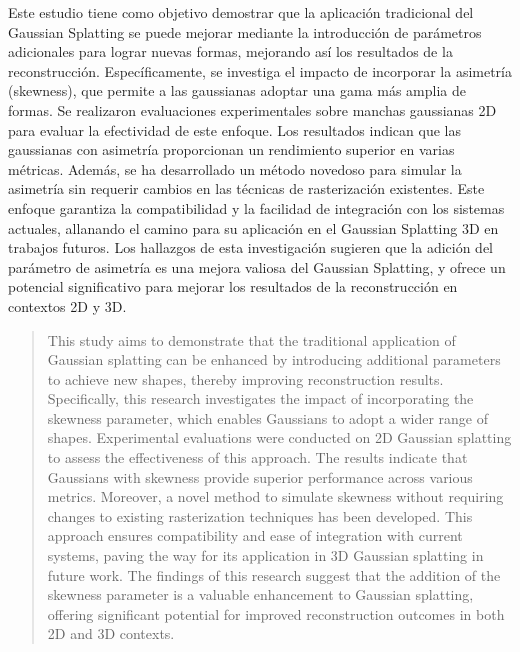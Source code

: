 \begin{resumen}
	Este estudio tiene como objetivo demostrar que la aplicación tradicional del Gaussian Splatting se puede mejorar mediante la introducción de parámetros adicionales para lograr nuevas formas, mejorando así los resultados
	de la reconstrucción. Específicamente, se investiga el impacto de incorporar la
	asimetría (skewness), que permite a las gaussianas adoptar una gama más amplia de formas. Se realizaron
	evaluaciones experimentales sobre manchas gaussianas 2D para evaluar la efectividad de este enfoque. Los
	resultados indican que las gaussianas con asimetría proporcionan un rendimiento superior en varias métricas. 
	Además, se ha desarrollado un método novedoso para simular la asimetría sin requerir cambios en las técnicas de rasterización existentes. Este enfoque garantiza la compatibilidad
	y la facilidad de integración con los sistemas actuales, allanando el camino para su aplicación en el Gaussian
	Splatting 3D en trabajos futuros. Los hallazgos de esta investigación sugieren que la adición del parámetro de
	asimetría es una mejora valiosa del Gaussian Splatting, y ofrece un potencial significativo para mejorar los
	resultados de la reconstrucción en contextos 2D y 3D.
\end{resumen}

\begin{abstract}
	This study aims to demonstrate that the traditional application of Gaussian splatting can be enhanced by
	introducing additional parameters to achieve new shapes, thereby improving reconstruction results. Specifically,
	this research investigates the impact of incorporating the skewness parameter, which enables Gaussians to adopt
	a wider range of shapes. Experimental evaluations were conducted on 2D Gaussian splatting to assess the
	effectiveness of this approach. The results indicate that Gaussians with skewness provide superior performance
	across various metrics. Moreover, a novel method to simulate skewness
	without requiring changes to existing rasterization techniques has been developed. This approach ensures
	compatibility and ease of integration with current systems, paving the way for its application in 3D Gaussian
	splatting in future work. The findings of this research suggest that the addition of the skewness parameter
	is a valuable enhancement to Gaussian splatting, offering significant potential for improved reconstruction
	outcomes in both 2D and 3D contexts.
\end{abstract}